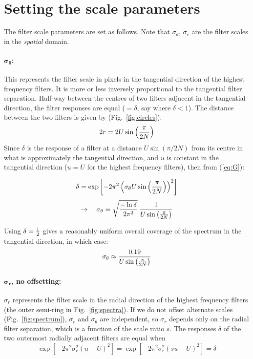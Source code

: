 \documentclass[12pt,a4]{article}
\begin{document}
\section{Setting the scale parameters}


The filter scale parameters are set as follows.  Note that $\sigma_\theta$, $\sigma_r$ are the filter scales in the {\em spatial} domain.  

\paragraph{$\mathbf{\sigma_\theta}$:} 
This represents the filter scale in pixels in the tangential direction of the highest frequency filters.  It is more or less inversely proportional to the tangential filter separation.  Half-way between the centres of two filters adjacent in the tangential direction, the filter responses are equal ($=\delta$, say where $\delta < 1$). The distance between the two filters is given by (Fig.~\ref{fig:circles}):
\def\Sinpbnn{\sin{\left(\pi\over2N\right)}}
\[ 2r = 2U \Sinpbnn \]
Since  $\delta$ is the response of a filter at a distance $U\sin(\pi/2N)$ from its centre in what is approximately the tangential direction, and $u$ is constant in the tangential direction ($u = U$ for the highest frequency filters), then from (\ref{eq:G}):

\[ \delta = \exp \left[ -2\pi^2 \left(\sigma_\theta U \Sinpbnn\right)^2  \right] \]
\[ \rightarrow\quad \sigma_\theta =
  \sqrt{-\ln\delta \over 2\pi^2}\; {1 \over U\Sinpbnn} 
\]

Using $\delta = {1\over2}$ gives a reasonably uniform overall coverage of the spectrum in the tangential direction, in which case:
\[ \sigma_\theta \approx {0.19 \over U\Sinpbnn} \]

\paragraph{$\mathbf{\sigma_r}$, no offsetting:}
$\sigma_r$ represents the filter scale in the radial direction of the highest frequency filters (the outer semi-ring in Fig.~\ref{fig:spectra}).  If we do not offset alternate scales (Fig.~\ref{fig:spectrum}), $\sigma_r$ and $\sigma_\theta$ are independent, so $\sigma_r$ depends only on the radial filter separation, which is a function of the scale ratio $s$.  The responses $\delta$ of the two outermost radially adjacent filters are equal when
\[ \exp\left[ -2\pi^2 \sigma_r^2 (u-U)^2\right]
= \exp\left[ -2\pi^2 \sigma_r^2 \left(su-U\right)^2\right] = \delta \]
\end{document}
